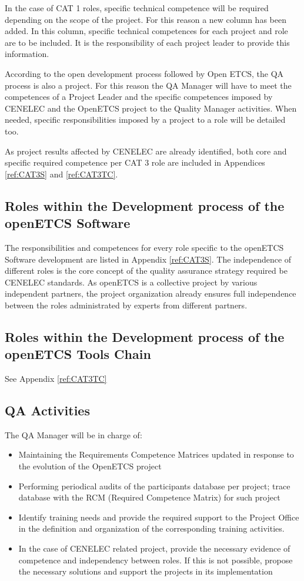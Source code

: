 \documentclass{template/openetcs_article}
\begin{document}
In the case of CAT 1 roles, specific technical competence will be required depending on the scope of the project. For this reason a new column has been added. In this column, specific technical competences for each project and role are to be included. It is the responsibility of each project leader to provide this information.

According to the open development process followed by Open ETCS, the QA process is also a project. For this reason the QA Manager will have to meet the competences of a Project Leader and the specific competences imposed by CENELEC and the OpenETCS project to the Quality Manager activities. When needed, specific responsibilities imposed by a project to a role will be detailed too.

As project results affected by CENELEC are already identified, both core and specific required competence per CAT 3 role are included in Appendices \ref{ref:CAT3S} and \ref{ref:CAT3TC}.

\subsection{Roles within the Development process of the openETCS Software}
The responsibilities and competences for every role specific to the openETCS Software development are listed in Appendix \ref{ref:CAT3S}. The independence of different roles is the core concept of the quality assurance strategy required be CENELEC standards. As openETCS is a collective project by various independent partners, the project organization already ensures full independence between the roles administrated by experts from different partners. 

\subsection{Roles within the Development process of the openETCS Tools Chain}

See Appendix \ref{ref:CAT3TC}
\subsection{QA Activities}

The QA Manager will be in charge of:
\begin{itemize}
\item Maintaining the Requirements Competence Matrices updated in response to the evolution of the OpenETCS project
\item Performing periodical audits of the participants{\textquotesingle} database per project; trace database with the RCM (Required Competence Matrix) for such project
\item Identify training needs and provide the required support to the Project Office in the definition and organization of the corresponding training activities.
\item In the case of CENELEC related project, provide the necessary evidence of competence and independency between roles. If this is not possible, propose the necessary solutions and support the projects in its implementation
\end{itemize}
\end{document}
